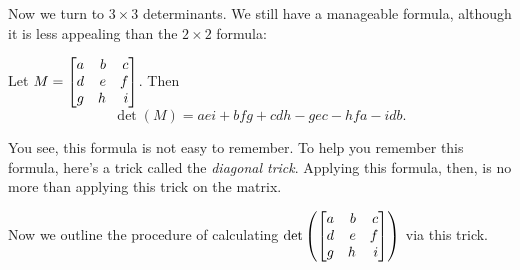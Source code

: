  Now we turn
to $3\times 3$ determinants. We still have a manageable formula, although it is less
appealing than the $2\times 2$ formula:
\begin{theorem}
	 Let
	$M=\mat{a & b & c \\ d & e & f \\ g & h & i}$. Then
	\[
		\det(M)=aei+bfg+cdh-gec-hfa-idb.
	\]
\end{theorem}
You see, this formula is not easy to remember. To help you remember this formula,
here's a trick called the \textit{diagonal trick}.
Applying this formula, then, is no more than applying this trick on the matrix.

Now we outline the procedure of calculating $\det\left(\mat{a & b & c \\ d & e & f \\ g & h & i}
\right)$ via this trick.

